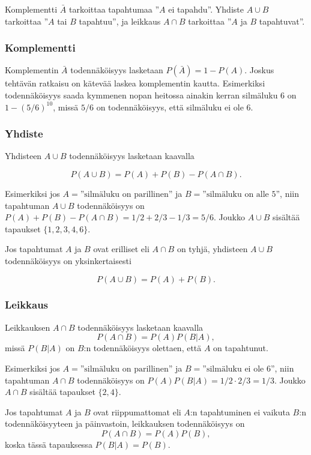 Komplementti $\bar A$
tarkoittaa tapahtumaa ''$A$ ei tapahdu''.
Yhdiste $A \cup B$
tarkoittaa ''$A$ tai $B$ tapahtuu'',
ja leikkaus
$A \cap B$ tarkoittaa
''$A$ ja $B$ tapahtuvat''.

\subsubsection*{Komplementti}

Komplementin $\bar A$
todennäköisyys lasketaan $P(\bar A)=1-P(A)$.
Joskus tehtävän ratkaisu on kätevää
laskea komplementin kautta.
Esimerkiksi todennäköisyys saada
kymmenen nopan heitossa ainakin
kerran silmäluku 6 on $1-(5/6)^{10}$,
missä $5/6$ on todennäköisyys, että silmäluku ei ole 6.

\subsubsection*{Yhdiste}

Yhdisteen $A \cup B$ todennäköisyys lasketaan kaavalla 

\[P(A \cup B)=P(A)+P(B)-P(A \cap B).\]

Esimerkiksi jos $A=\textrm{''silmäluku on parillinen''}$
ja $B=\textrm{''silmäluku on alle 5''}$,
niin tapahtuman $A \cup B$ todennäköisyys
on $P(A)+P(B)-P(A \cap B)=1/2+2/3-1/3=5/6$.
Joukko $A \cup B$ sisältää tapaukset $\{1,2,3,4,6\}$.

Jos tapahtumat $A$ ja $B$ ovat erilliset eli $A \cap B$ on tyhjä,
yhdisteen $A \cup B$ todennäköisyys on yksinkertaisesti

\[P(A \cup B)=P(A)+P(B).\]

\subsubsection*{Leikkaus}

Leikkauksen $A \cap B$ todennäköisyys lasketaan kaavalla
\[P(A \cap B)=P(A)P(B|A),\]
missä $P(B|A)$ on $B$:n todennäköisyys
olettaen, että $A$ on tapahtunut.

Esimerkiksi jos $A=\textrm{''silmäluku on parillinen''}$
ja $B=\textrm{''silmäluku ei ole 6''}$,
niin tapahtuman $A \cap B$ todennäköisyys
on $P(A)P(B|A)=1/2 \cdot 2/3 = 1/3$.
Joukko $A \cap B$ sisältää tapaukset $\{2,4\}$.


Jos tapahtumat $A$ ja $B$ ovat riippumattomat
eli $A$:n tapahtuminen ei vaikuta $B$:n todennäköisyyteen
ja päinvastoin, leikkauksen todennäköisyys on
\[P(A \cap B)=P(A)P(B),\]
koska tässä tapauksessa $P(B|A)=P(B)$.

